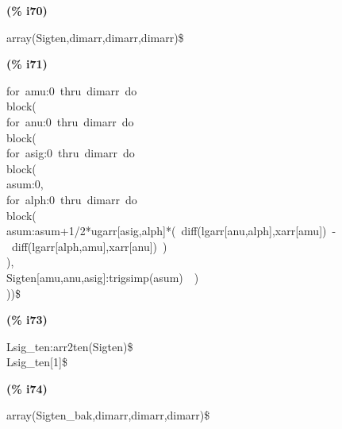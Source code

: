 \documentclass[fleqn]{article}
\begin{document}
\noindent
\begin{minipage}[t]{4.000000em}\color{red}\bfseries
(\% i70)	
\end{minipage}
\begin{minipage}[t]{\textwidth}\color{blue}
array(Sigten,dimarr,dimarr,dimarr)\$
\end{minipage}

\noindent%



\noindent
\begin{minipage}[t]{4.000000em}\color{red}\bfseries
(\% i71)	
\end{minipage}
\begin{minipage}[t]{\textwidth}\color{blue}
for\ amu:0\ thru\ dimarr\ do\\
block(\\
for\ anu:0\ thru\ dimarr\ do\\
block(\\
for\ asig:0\ thru\ dimarr\ do\\
block(\\
asum:0,\\
for\ alph:0\ thru\ dimarr\ do\\
block(\\
asum:asum+1/2*ugarr[asig,alph]*(\ diff(lgarr[anu,alph],xarr[amu])\ -\ diff(lgarr[alph,amu],xarr[anu])\ )\\
),\\
Sigten[amu,anu,asig]:trigsimp(asum)\ \ )\\
))\$
\end{minipage}

\noindent%



\noindent
\begin{minipage}[t]{4.000000em}\color{red}\bfseries
(\% i73)	
\end{minipage}
\begin{minipage}[t]{\textwidth}\color{blue}
Lsig\_ten:arr2ten(Sigten)\$\\
Lsig\_ten[1]\$
\end{minipage}

\noindent%



\noindent
\begin{minipage}[t]{4.000000em}\color{red}\bfseries
(\% i74)	
\end{minipage}
\begin{minipage}[t]{\textwidth}\color{blue}
array(Sigten\_bak,dimarr,dimarr,dimarr)\$
\end{minipage}
\end{document}
